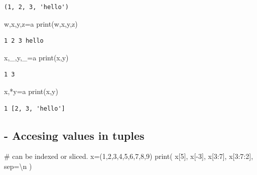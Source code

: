 \documentclass[
  a4paper,
  DIV=11,
  numbers=noendperiod]{scrreprt}
\newenvironment{Shaded}{\begin{snugshade}}{\end{snugshade}}
\newcommand{\BuiltInTok}[1]{\textcolor[rgb]{0.00,0.23,0.31}{#1}}
\newcommand{\CharTok}[1]{\textcolor[rgb]{0.13,0.47,0.30}{#1}}
\newcommand{\CommentTok}[1]{\textcolor[rgb]{0.37,0.37,0.37}{#1}}
\newcommand{\DecValTok}[1]{\textcolor[rgb]{0.68,0.00,0.00}{#1}}
\newcommand{\NormalTok}[1]{\textcolor[rgb]{0.00,0.23,0.31}{#1}}
\newcommand{\OperatorTok}[1]{\textcolor[rgb]{0.37,0.37,0.37}{#1}}
\newcommand{\StringTok}[1]{\textcolor[rgb]{0.13,0.47,0.30}{#1}}
\begin{document}
\begin{verbatim}
(1, 2, 3, 'hello')
\end{verbatim}

\begin{Shaded}
\begin{Highlighting}[]
\NormalTok{w,x,y,z}\OperatorTok{=}\NormalTok{a}
\BuiltInTok{print}\NormalTok{(w,x,y,z)}
\end{Highlighting}
\end{Shaded}

\begin{verbatim}
1 2 3 hello
\end{verbatim}

\begin{Shaded}
\begin{Highlighting}[]
\NormalTok{x,\_,y,\_}\OperatorTok{=}\NormalTok{a}
\BuiltInTok{print}\NormalTok{(x,y)}
\end{Highlighting}
\end{Shaded}

\begin{verbatim}
1 3
\end{verbatim}

\begin{Shaded}
\begin{Highlighting}[]
\NormalTok{x,}\OperatorTok{*}\NormalTok{y}\OperatorTok{=}\NormalTok{a}
\BuiltInTok{print}\NormalTok{(x,y)}
\end{Highlighting}
\end{Shaded}

\begin{verbatim}
1 [2, 3, 'hello']
\end{verbatim}

\subsection{- Accesing values in
tuples}\label{accesing-values-in-tuples}

\begin{Shaded}
\begin{Highlighting}[]
\CommentTok{\# can be indexed or sliced.}
\NormalTok{x}\OperatorTok{=}\NormalTok{(}\DecValTok{1}\NormalTok{,}\DecValTok{2}\NormalTok{,}\DecValTok{3}\NormalTok{,}\DecValTok{4}\NormalTok{,}\DecValTok{5}\NormalTok{,}\DecValTok{6}\NormalTok{,}\DecValTok{7}\NormalTok{,}\DecValTok{8}\NormalTok{,}\DecValTok{9}\NormalTok{)}
\BuiltInTok{print}\NormalTok{(}
\NormalTok{    x[}\DecValTok{5}\NormalTok{],}
\NormalTok{    x[}\OperatorTok{{-}}\DecValTok{3}\NormalTok{],}
\NormalTok{    x[}\DecValTok{3}\NormalTok{:}\DecValTok{7}\NormalTok{],}
\NormalTok{    x[}\DecValTok{3}\NormalTok{:}\DecValTok{7}\NormalTok{:}\DecValTok{2}\NormalTok{],}
\NormalTok{    sep}\OperatorTok{=}\StringTok{\textquotesingle{}}\CharTok{\textbackslash{}n}\StringTok{\textquotesingle{}}
\NormalTok{)}
\end{Highlighting}
\end{Shaded}
\end{document}
